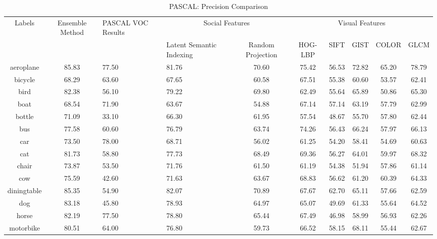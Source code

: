 \newpage

\begin{sidewaystable}
\caption{ PASCAL: Precision Comparison} %
\vspace*{0.2 cm}
\begin{tabular}{|c|c| p{2cm}| p{2cm}|c|c|c|c|c|c|} %
Labels  & Ensemble Method  & PASCAL VOC Results & \multicolumn{2}{c}{Social Features}  & \multicolumn{5}{c}{Visual Features}\\ [0.5ex] 
 &  & & Latent Semantic Indexing & Random Projection & HOG-LBP & SIFT & GIST & COLOR & GLCM \\  [1ex] \hline
  
aeroplane & 85.83 & 77.50 & 81.76 & 70.60 & 75.42 & 56.53 & 72.82 & 65.20 & 78.79 \\  [1ex]
bicycle & 68.29 & 63.60 & 67.65 & 60.58 & 67.51 & 55.38 & 60.60 & 53.57 & 62.41 \\  [1ex]
bird & 82.38 & 56.10 & 79.22 & 69.80 & 62.49 & 55.64 & 65.89 & 50.86 & 65.30 \\  [1ex]
boat & 68.54 & 71.90 & 63.67 & 54.88 & 67.14 & 57.14 & 63.19 & 57.79 & 62.99 \\  [1ex]
bottle & 71.09 & 33.10 & 66.30 & 61.95 & 57.54 & 48.67 & 55.70 & 57.80 & 62.44 \\  [1ex] 
bus & 77.58 & 60.60 & 76.79 & 63.74 & 74.26 & 56.43 & 66.24 & 57.97 & 66.13 \\  [1ex]
car & 73.50 & 78.00 & 68.71 & 56.02 & 61.25 & 54.20 & 58.41 & 54.69 & 60.63 \\  [1ex]
cat & 81.73 & 58.80 & 77.73 & 68.49 & 69.36 & 56.27 & 64.01 & 59.97 & 68.32 \\  [1ex]
chair & 73.87 & 53.50 & 71.76 & 61.50 & 61.19 & 54.38 & 51.94 & 57.86 & 61.14 \\  [1ex]
cow & 75.59 & 42.60 & 71.63 & 63.67 & 68.83 & 56.62 & 61.20 & 60.39 & 64.33 \\  [1ex]
diningtable & 85.35 & 54.90 & 82.07 & 70.89 & 67.67 & 62.70 & 65.11 & 57.66 & 62.59 \\  [1ex]
dog & 83.18 & 45.80 & 78.93 & 64.97 & 65.07 & 49.69 & 61.33 & 55.64 & 64.52 \\  [1ex]
horse & 82.19 & 77.50 & 78.80 & 65.44 & 67.49 & 46.98 & 58.99 & 56.93 & 62.26 \\  [1ex]
motorbike & 80.51 & 64.00 & 76.80 & 59.73 & 66.52 & 58.15 & 68.11 & 55.44 & 62.67 \\  [1ex]

\end{tabular}
\end{sidewaystable}
